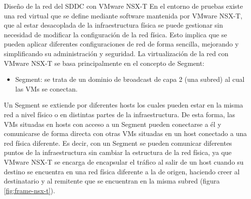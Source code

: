 

\begin{subsubsection}{Diseño de la red del SDDC con VMware NSX-T}
    En el entorno de pruebas existe una red virtual que se define mediante software mantenida por VMware NSX-T, que al estar desacoplada de la infraestructura física se puede gestionar sin necesidad de modificar la configuración de la red física. Esto implica que se pueden aplicar diferentes configuraciones de red de forma sencilla, mejorando y simplificando su administración y seguridad. La virtualización de la red con VMware NSX-T se basa principalmente en el concepto de Segment:
    \begin{itemize}
        \item Segment: se trata de un dominio de broadcast de capa 2 (una subred) al cual las VMs se conectan.
    \end{itemize}
    Un Segment se extiende por diferentes hosts los cuales pueden estar en la misma red a nivel físico o en distintas partes de la infraestructura. De esta forma, las VMs situadas en hosts con acceso a un Segment pueden conectarse a él y comunicarse de forma directa con otras VMs situadas en un host conectado a una red física diferente. Es decir, con un Segment se pueden comunicar diferentes puntos de la infraestructura sin cambiar la estructura de la red física, ya que VMware NSX-T se encarga de encapsular el tráfico al salir de un host cuando su destino se encuentra en una red física diferente a la de origen, haciendo creer al destinatario y al remitente que se encuentran en la misma subred (figura \ref{fig:frame-nsx-t}).

\end{subsubsection}
